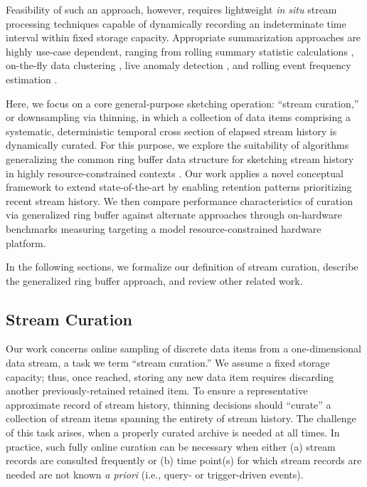 Feasibility of such an approach, however, requires lightweight \textit{in situ} stream processing techniques capable of dynamically recording an indeterminate time interval within fixed storage capacity.
Appropriate summarization approaches are highly use-case dependent, ranging from rolling summary statistic calculations \citep{lin2004continuously}, on-the-fly data clustering \citep{silva2013data}, live anomaly detection \citep{cai2004maids}, and rolling event frequency estimation \citep{manku2002approximate}.

Here, we focus on a core general-purpose sketching operation: ``stream curation,'' or downsampling via thinning, in which a collection of data items comprising a systematic, deterministic temporal cross section of elapsed stream history is dynamically curated.
For this purpose, we explore the suitability of algorithms generalizing the common ring buffer data structure for sketching stream history in highly resource-constrained contexts \citep{gunther2014compressing}.
Our work applies a novel conceptual framework to extend state-of-the-art by enabling retention patterns prioritizing recent stream history.
We then compare performance characteristics of curation via generalized ring buffer against alternate approaches through on-hardware benchmarks measuring targeting a model resource-constrained hardware platform.

In the following sections, we formalize our definition of stream curation, describe the generalized ring buffer approach, and review other related work.

\subsection{Stream Curation}
\label{sec:stream-curation-problem}

Our work concerns online sampling of discrete data items from a one-dimensional data stream, a task we term ``stream curation.''
We assume a fixed storage capacity; thus, once reached, storing any new data item requires discarding another previously-retained retained item.
To ensure a representative approximate record of stream history, thinning decisions should ``curate'' a collection of stream items spanning the entirety of stream history.
The challenge of this task arises, when a properly curated archive is needed at all times.
In practice, such fully online curation can be necessary when either (a) stream records are consulted frequently or (b) time point(s) for which stream records are needed are not known \textit{a priori} (i.e., query- or trigger-driven events).

